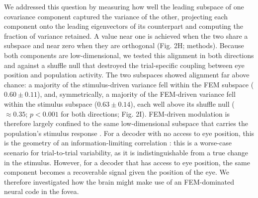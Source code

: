 \documentclass{lite}
\begin{document}
We addressed this question by measuring how well the leading subspace of one covariance component captured the variance of the other, projecting each component onto the leading eigenvectors of its counterpart and computing the fraction of variance retained. A value near one is achieved when the two share a subspace and near zero when they are orthogonal (Fig. 2H; methods). Because both components are low-dimensional, we tested this alignment in both directions and against a shuffle null that destroyed the trial-specific coupling between eye position and population activity. The two subspaces showed alignment far above chance: a majority of the stimulus-driven variance fell within the FEM subspace ($0.60 \pm 0.11$), and, symmetrically, a majority of the FEM-driven variance fell within the stimulus subspace ($0.63 \pm 0.14$), each well above its shuffle null ($\approx 0.35$; $p < 0.001$ for both directions; Fig. 2I). FEM-driven modulation is therefore largely confined to the same low-dimensional subspace that carries the population's stimulus response \cite{liska2024running}. For a decoder with no access to eye position, this is the geometry of an information-limiting correlation \cite{moreno2014information}: this is a worse-case scenario for trial-to-trial variability, as it is indistinguishable from a true change in the stimulus. However, for a decoder that has access to eye position, the same component becomes a recoverable signal given the position of the eye. We therefore investigated how the brain might make use of an FEM-dominated neural code in the fovea. 

\end{document}
